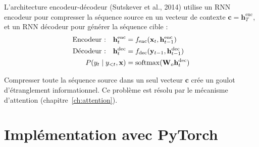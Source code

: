 \begin{definition}
L'architecture encodeur-d\'ecodeur (Sutskever et al., 2014) utilise un RNN
encodeur pour compresser la s\'equence source en un vecteur de contexte
$\mathbf{c} = \mathbf{h}_T^{\text{enc}}$, et un RNN d\'ecodeur pour g\'en\'erer
la s\'equence cible :
\begin{align}
\text{Encodeur :} \quad \mathbf{h}_t^{\text{enc}} &= f_{\text{enc}}(\mathbf{x}_t, \mathbf{h}_{t-1}^{\text{enc}}) \\
\text{D\'ecodeur :} \quad \mathbf{h}_t^{\text{dec}} &= f_{\text{dec}}(\mathbf{y}_{t-1}, \mathbf{h}_{t-1}^{\text{dec}}) \\
P(y_t \mid y_{<t}, \mathbf{x}) &= \operatorname{softmax}(\mathbf{W}_o \mathbf{h}_t^{\text{dec}})
\end{align}
\end{definition}

\begin{attention}[title=\textbf{Goulot d'\'etranglement}]
Compresser toute la s\'equence source dans un seul vecteur $\mathbf{c}$ cr\'ee
un goulot d'\'etranglement informationnel. Ce probl\`eme est r\'esolu par le
m\'ecanisme d'attention (chapitre~\ref{ch:attention}).
\end{attention}

\section{Impl\'ementation avec PyTorch}
\label{sec:seq:implementation}

